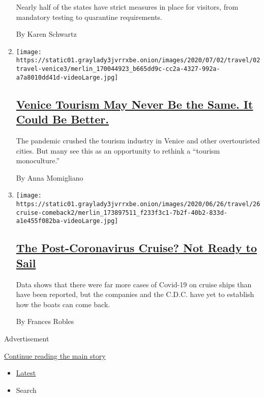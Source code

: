 \begin{enumerate}
  Nearly half of the states have strict measures in place for visitors,
  from mandatory testing to quarantine requirements.

  By Karen Schwartz
\item
  \texttt{[image: https://static01.graylady3jvrrxbe.onion/images/2020/07/02/travel/02travel-venice3/merlin\_170044923\_b665dd9c-cc2a-4327-992a-a7a8010dd41d-videoLarge.jpg]}

  \hypertarget{venice-tourism-may-never-be-the-same-it-could-be-better}{%
  \subsection{\texorpdfstring{\href{/2020/07/02/travel/venice-coronavirus-tourism.html}{Venice
  Tourism May Never Be the Same. It Could Be
  Better.}}{Venice Tourism May Never Be the Same. It Could Be Better.}}\label{venice-tourism-may-never-be-the-same-it-could-be-better}}

  The pandemic crushed the tourism industry in Venice and other
  overtouristed cities. But many see this as an opportunity to rethink a
  ``tourism monoculture.''

  By Anna Momigliano
\item
  \texttt{[image: https://static01.graylady3jvrrxbe.onion/images/2020/06/26/travel/26cruise-comeback2/merlin\_173897511\_f233f3c1-7b2f-40b2-833d-a1e455f082ba-videoLarge.jpg]}

  \hypertarget{the-post-coronavirus-cruise-not-ready-to-sail}{%
  \subsection{\texorpdfstring{\href{/2020/06/26/travel/coronavirus-cruises-reopening.html}{The
  Post-Coronavirus Cruise? Not Ready to
  Sail}}{The Post-Coronavirus Cruise? Not Ready to Sail}}\label{the-post-coronavirus-cruise-not-ready-to-sail}}

  Data shows that there were far more cases of Covid-19 on cruise ships
  than have been reported, but the companies and the C.D.C. have yet to
  establish how the boats can come back.

  By Frances Robles
\end{enumerate}

Advertisement

\protect\hyperlink{after-mid1}{Continue reading the main story}

\begin{itemize}
\tightlist
\item
  \protect\hyperlink{stream-panel}{Latest}
\item
  Search
\end{itemize}

